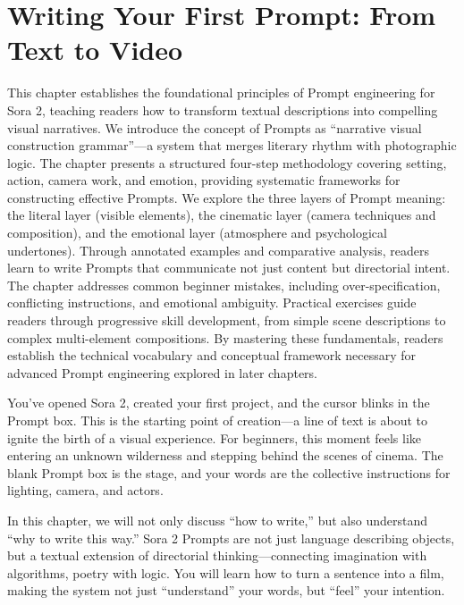 \chapter{Writing Your First Prompt: From Text to Video}
\label{ch:first-Prompt}

\begin{chapterabstract}
This chapter establishes the foundational principles of Prompt engineering for Sora 2, teaching readers how to transform textual descriptions into compelling visual narratives. We introduce the concept of Prompts as ``narrative visual construction grammar''—a system that merges literary rhythm with photographic logic. The chapter presents a structured four-step methodology covering setting, action, camera work, and emotion, providing systematic frameworks for constructing effective Prompts. We explore the three layers of Prompt meaning: the literal layer (visible elements), the cinematic layer (camera techniques and composition), and the emotional layer (atmosphere and psychological undertones). Through annotated examples and comparative analysis, readers learn to write Prompts that communicate not just content but directorial intent. The chapter addresses common beginner mistakes, including over-specification, conflicting instructions, and emotional ambiguity. Practical exercises guide readers through progressive skill development, from simple scene descriptions to complex multi-element compositions. By mastering these fundamentals, readers establish the technical vocabulary and conceptual framework necessary for advanced Prompt engineering explored in later chapters.
\end{chapterabstract}

You've opened Sora 2, created your first project, and the cursor blinks in the Prompt box. This is the starting point of creation---a line of text is about to ignite the birth of a visual experience. For beginners, this moment feels like entering an unknown wilderness and stepping behind the scenes of cinema. The blank Prompt box is the stage, and your words are the collective instructions for lighting, camera, and actors.

In this chapter, we will not only discuss ``how to write,'' but also understand ``why to write this way.'' Sora 2 Prompts are not just language describing objects, but a textual extension of directorial thinking---connecting imagination with algorithms, poetry with logic. You will learn how to turn a sentence into a film, making the system not just ``understand'' your words, but ``feel'' your intention.

